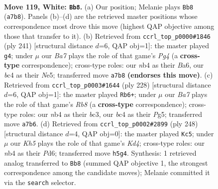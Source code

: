 \documentclass[11pt]{article}
\begin{document}
\clearpage

\begin{figure}[p]\centering
\begin{subfigure}{0.46\textwidth}\centering
\resizebox{\linewidth}{!}{%
\newchessgame
\chessboard[
  setfen={8/B6k/8/7K/1nb2P2/8/8/8 w - - 1 119},
  showmover=false,
  pgfstyle=straightmove, color=movearrow, markmove={a7-b8}
]}
\caption{}
\end{subfigure}\hfill
\begin{subfigure}{0.46\textwidth}\centering
\resizebox{\linewidth}{!}{%
\newchessgame
\chessboard[
  setfen={8/8/b7/4n1p1/8/7k/2NN1K2/8 b - - 9 121},
  showmover=false,
  pgfstyle=straightmove, color=movearrow, markmove={g5-g4}
]}
\caption{}
\end{subfigure}
\\[4pt]
\begin{subfigure}{0.46\textwidth}\centering
\resizebox{\linewidth}{!}{%
\newchessgame
\chessboard[
  setfen={1R6/5p2/3k4/6P1/4K3/2b5/8/8 w - - 83 115},
  showmover=false,
  pgfstyle=straightmove, color=movearrow, markmove={b8-b6}
]}
\caption{}
\end{subfigure}\hfill
\begin{subfigure}{0.46\textwidth}\centering
\resizebox{\linewidth}{!}{%
\newchessgame
\chessboard[
  setfen={2k5/6P1/3P4/8/3K3B/1b6/8/8 w - - 33 125},
  showmover=false,
  pgfstyle=straightmove, color=movearrow, markmove={d4-c5}
]}
\caption{}
\end{subfigure}
\caption{\textbf{Move 119, White: \texttt{Bb8}.} (a) Our position; Melanie plays \texttt{Bb8} (\texttt{a7b8}). Panels (b)--(d) are the retrieved master positions whose correspondence most drove this move (highest QAP objective among those that transfer to it). (b) Retrieved from \texttt{ccrl\_top\_p0000\#1846} (ply 241) [structural distance $d$=6, QAP obj=1]: the master played \texttt{g4}; under $\mu$ our \emph{Ba7} plays the role of that game's \emph{Pg4} (a \textbf{cross-type} correspondence); cross-type roles: our \emph{n}b4 as their \emph{B}a6, our \emph{b}c4 as their \emph{N}e5; transferred move \texttt{a7b8} \textbf{(endorses this move)}. (c) Retrieved from \texttt{ccrl\_top\_p0003\#1644} (ply 228) [structural distance $d$=6, QAP obj=1]: the master played \texttt{Rb6+}; under $\mu$ our \emph{Ba7} plays the role of that game's \emph{Rb8} (a \textbf{cross-type} correspondence); cross-type roles: our \emph{n}b4 as their \emph{b}c3, our \emph{b}c4 as their \emph{P}g5; transferred move \texttt{a7b6}. (d) Retrieved from \texttt{ccrl\_top\_p0002\#2899} (ply 248) [structural distance $d$=4, QAP obj=0]: the master played \texttt{Kc5}; under $\mu$ our \emph{Kh5} plays the role of that game's \emph{Kd4}; cross-type roles: our \emph{n}b4 as their \emph{P}d6; transferred move \texttt{h5g4}. Synthesis: 1 retrieved analog transferred to \texttt{Bb8} (summed QAP objective 1, the strongest correspondence among the candidate moves); Melanie committed it via the \texttt{search} selector.}
\label{fig:thought-m236}
\end{figure}
\end{document}
